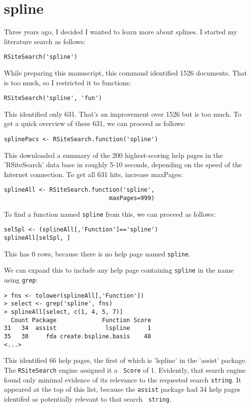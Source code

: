 \section*{spline}

Three years ago, I decided I wanted to learn more about
splines.  I started my literature search as follows:
\begin{verbatim}
RSiteSearch('spline')
\end{verbatim}
While preparing this manuscript, this command identified 1526
documents.  That is too much, so I restricted it to functions:
\begin{verbatim}
RSiteSearch('spline', 'fun')
\end{verbatim}
This identified only 631.  That's an improvement over 1526 but is too
much.  To get a quick overview of these 631, we can proceed as
follows:
\begin{verbatim}
splinePacs <- RSiteSearch.function('spline')
\end{verbatim}
This downloaded a summary of the 200 highest-scoring help pages in
the 'RSiteSearch' data base in roughly 5-10 seconds, depending on the
speed of the Internet connection.  To get all 631 hits, increase
maxPages:
\begin{verbatim}
splineAll <- RSiteSearch.function('spline',
                              maxPages=999)
\end{verbatim}
To find a function named {\tt spline} from this, we can proceed as
follows:
\begin{verbatim}
selSpl <- (splineAll[,'Function']=='spline')
splineAll[selSpl, ]
\end{verbatim}
This has 0 rows, because there is no help page named {\tt spline}.

We can expand this to include any help page containing {\tt spline} in
the name using {\tt grep}:
\begin{verbatim}
> fns <- tolower(splineAll[,'Function'])
> select <- grep('spline', fns)
> splineAll[select, c(1, 4, 5, 7)]
  Count Package             Function Score
31   34  assist              lspline     1
35   30     fda create.bspline.basis    48
<...>
\end{verbatim}
This identified 66 help pages, the first of which is 'lspline' in the
'assist' package.  The {\tt RSiteSearch} engine assigned it a {\tt
Score} of 1.  Evidently, that search engine found only minimal
evidence of its relevance to the requested search {\tt string}.  It
appeared at the top of this list, because the {\tt assist} package had
34 help pages identifed as potentially relevant to that search {\tt
string}.

